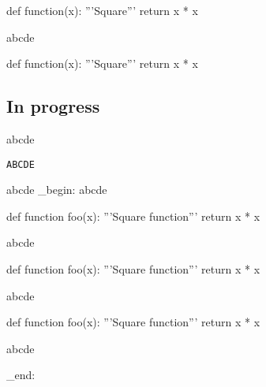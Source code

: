 \begin{CDRBlock}[pygments=true,engine=codebox,label=SWAP,lang=python]
def function(x):
  '''Square'''
  return x * x
\end{CDRBlock}
abcde
\begin{CDRBlock}[pygments=false,engine=codebox,label=SWAP]
def function(x):
  '''Square'''
  return x * x
\end{CDRBlock}


\makeatother
\egroup

\subsection{In progress}
abcde
\begin{Verbatim}
ABCDE
\end{Verbatim}
abcde%
\ExplSyntaxOn
\group_begin:
\makeatletter
\ExplSyntaxOff
\noindent
\def\CDR@Debug{\typeout}%
\typeout{------------------================-------------------}%
abcde
\begin{CDRBlock}[
  frame=lines,
  rulecolor=\color{red!20!yellow}
]
def function foo(x):
  '''Square function'''
  return x * x
\end{CDRBlock}
\noindent
abcde
\begin{CDRBlock}[pygments=false,frame=lines,rulecolor=\color{red!20!yellow}]
def function foo(x):
  '''Square function'''
  return x * x
\end{CDRBlock}
abcde
\begin{CDRBlock}
def function foo(x):
  '''Square function'''
  return x * x
\end{CDRBlock}
abcde

\ExplSyntaxOn
\makeatother
\group_end:
\ExplSyntaxOff
